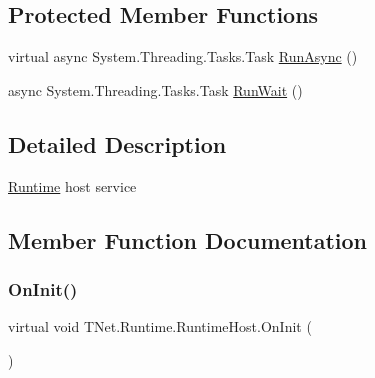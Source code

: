\subsection*{Protected Member Functions}
\begin{DoxyCompactItemize}
\item 
virtual async System.\+Threading.\+Tasks.\+Task \mbox{\hyperlink{class_t_net_1_1_runtime_1_1_runtime_host_a0cf19356ca915f444bfbcd66979562f9}{Run\+Async}} ()
\item 
async System.\+Threading.\+Tasks.\+Task \mbox{\hyperlink{class_t_net_1_1_runtime_1_1_runtime_host_ae87f09ce2459b2206cfdfd1769628f17}{Run\+Wait}} ()
\end{DoxyCompactItemize}


\subsection{Detailed Description}
\mbox{\hyperlink{namespace_t_net_1_1_runtime}{Runtime}} host service 



\subsection{Member Function Documentation}
\mbox{\label{class_t_net_1_1_runtime_1_1_runtime_host_a00be2f1685596dbcdf303ffe409f0655}} 
\subsubsection{\texorpdfstring{On\+Init()}{OnInit()}}
{\footnotesize\ttfamily virtual void T\+Net.\+Runtime.\+Runtime\+Host.\+On\+Init (\begin{DoxyParamCaption}{ }\end{DoxyParamCaption})\hspace{0.3cm}{\ttfamily [virtual]}}





\mbox{\label{class_t_net_1_1_runtime_1_1_runtime_host_acfc2f1f36f5e2380b6d231ab935db616}} 
